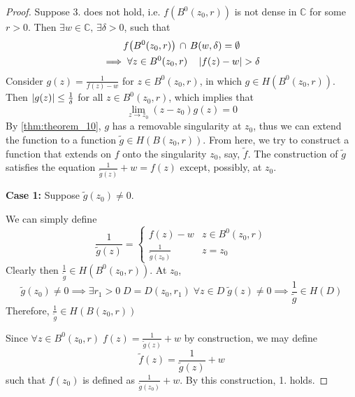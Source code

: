 \documentclass[notoc,notitlepage]{tufte-book}
\begin{document}
\begin{proof}
	Suppose 3. does not hold, i.e. $f(B^0(z_0, r))$ is not dense in $\mathbb{C}$ for some $r > 0$. Then $\exists w \in \mathbb{C}, \, \exists \delta > 0$, such that
	\begin{gather*}
		f\big( B^0(z_0, r) \big) \, \cap \, B(w, \delta) = \emptyset \\
		\implies \forall z \in B^0(z_0, r) \quad \left|f(z) - w\right| > \delta
	\end{gather*}
	Consider $g(z) = \frac{1}{f(z) - w}$ for $z \in B^0(z_0, r)$, in which $g \in H(B^0(z_0, r))$. Then $\left|g(z)\right| \leq \frac{1}{\delta}$ for all $z \in B^0(z_0, r)$, which implies that
	\begin{equation*}
		\lim_{z \to z_0} (z - z_0) g(z) = 0
	\end{equation*}
	By \cref{thm:theorem_10}, $g$ has a removable singularity at $z_0$, thus we can extend the function to a function $\tilde{g} \in H(B(z_0, r))$. From here, we try to construct a function that extends on $f$ onto the singularity $z_0$, say, $\tilde{f}$. The construction of $\tilde{g}$ satisfies the equation $\frac{1}{\tilde{g}(z)} + w = f(z)$ except, possibly, at $z_0$.

	\textbf{Case 1:} Suppose $\tilde{g}(z_0) \neq 0$.

	We can simply define
	\begin{equation*}
		\frac{1}{\tilde{g}(z)} = \begin{cases}
			f(z) - w 	& z \in B^0(z_0, r) \\
			\frac{1}{\tilde{g}(z_0)} & z = z_0
		\end{cases}
	\end{equation*}
	Clearly then $\frac{1}{\tilde{g}} \in H(B^0(z_0, r))$. At $z_0$,
	\begin{equation*}
		\tilde{g}(z_0) \neq 0 \implies \exists r_1 > 0 \; D = D(z_0, r_1) \; \forall z \in D \; \tilde{g}(z) \neq 0 \implies \frac{1}{\tilde{g}} \in H(D)
	\end{equation*}
	Therefore, $\frac{1}{\tilde{g}} \in H(B(z_0, r))$

	Since $\forall z \in B^0(z_0, r) \; f(z) = \frac{1}{\tilde{g}(z)} + w$ by construction, we may define
	\begin{equation*}
		\tilde{f}(z) = \frac{1}{\tilde{g}(z)} + w
	\end{equation*}
	such that $f(z_0)$ is defined as $\frac{1}{\tilde{g}(z_0)} + w$. By this construction, 1. holds.


\end{proof}
\end{document}
